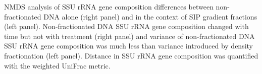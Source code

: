 NMDS analysis of SSU rRNA gene composition differences between 
non-fractionated DNA alone (right panel) and in the context of SIP gradient
fractions (left panel). Non-fractionated DNA SSU rRNA gene composition changed
with time but not with treatment (right panel) and variance of non-fractionated
DNA SSU rRNA gene composition was much less than variance introduced by density
fractionation (left panel). Distance in SSU rRNA gene composition was
quantified with the weighted UniFrac metric.

